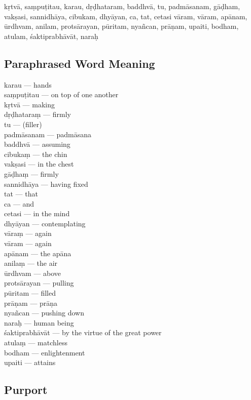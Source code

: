 kṛtvā, saṃpuṭitau, karau,  dṛḍhataram, baddhvā, tu, padmāsanam, gāḍham, vakṣasi, sannidhāya, cibukam, dhyāyan, ca, tat, cetasi vāram, vāram,  apānam, ūrdhvam, anilam, protsārayan, pūritam, nyañcan, prāṇam, upaiti, bodham, atulam,  śaktiprabhāvāt, naraḥ

\subsection*{Paraphrased Word Meaning}

\begin{multicols}{2}
karau  ---  hands \\
saṃpuṭitau ---  on top of one another \\
kṛtvā ---  making \\
dṛḍhataraṃ ---  firmly \\
tu ---  (filler)  \\
padmāsanam ---  padmāsana \\
baddhvā ---  assuming  \\
cibukaṃ ---  the chin  \\
vakṣasi ---  in the chest \\ 
gāḍhaṃ ---  firmly  \\
sannidhāya ---  having fixed  \\
tat --- that  \\
ca ---   and  \\
cetasi --- in the mind   \\
dhyāyan ---  contemplating \\  
vāraṃ ---  again  \\
vāram ---  again  \\
apānam ---  the apāna \\
anilaṃ ---  the air  \\
ūrdhvam ---  above  \\
protsārayan ---  pulling  \\
pūritam ---  filled  \\
prāṇam ---  prāṇa \\
nyañcan ---  pushing down  \\
naraḥ --- human being  \\
śaktiprabhāvāt ---  by the virtue of the great power  \\
atulaṃ ---  matchless  \\
bodham ---  enlightenment  \\
upaiti ---  attains
\end{multicols}

\subsection*{Purport}

